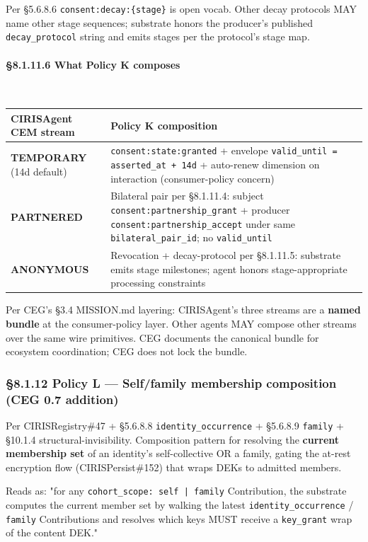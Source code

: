\documentclass[10pt]{article}
\begin{document}
Per §5.6.8.6 \texttt{consent:decay:\{stage\}} is open vocab. Other decay protocols MAY name other stage sequences; substrate honors the producer's published \texttt{decay\_protocol} string and emits stages per the protocol's stage map.


\paragraph{§8.1.11.6 What Policy K composes}\mbox{}\\


{\footnotesize
\begin{longtable}{|p{8.0cm}|p{8.0cm}|}\hline
\textbf{CIRISAgent CEM stream} & \textbf{Policy K composition} \\ \hline\endhead
\textbf{TEMPORARY} (14d default) & \texttt{consent:state:granted} + envelope \texttt{valid\_until = asserted\_at + 14d} + auto-renew dimension on interaction (consumer-policy concern) \\ \hline
\textbf{PARTNERED} & Bilateral pair per §8.1.11.4: subject \texttt{consent:partnership\_grant} + producer \texttt{consent:partnership\_accept} under same \texttt{bilateral\_pair\_id}; no \texttt{valid\_until} \\ \hline
\textbf{ANONYMOUS} & Revocation + decay-protocol per §8.1.11.5: substrate emits stage milestones; agent honors stage-appropriate processing constraints \\ \hline
\end{longtable}}


Per CEG's §3.4 MISSION.md layering: CIRISAgent's three streams are a \textbf{named bundle} at the consumer-policy layer. Other agents MAY compose other streams over the same wire primitives. CEG documents the canonical bundle for ecosystem coordination; CEG does not lock the bundle.


\subsubsection*{§8.1.12 Policy L — Self/family membership composition (CEG 0.7 addition)}


Per CIRISRegistry\#47 + §5.6.8.8 \texttt{identity\_occurrence} + §5.6.8.9 \texttt{family} + §10.1.4 structural-invisibility. Composition pattern for resolving the \textbf{current membership set} of an identity's self-collective OR a family, gating the at-rest encryption flow (CIRISPersist\#152) that wraps DEKs to admitted members.


Reads as: "for any \texttt{cohort\_scope: self | family} Contribution, the substrate computes the current member set by walking the latest \texttt{identity\_occurrence} / \texttt{family} Contributions and resolves which keys MUST receive a \texttt{key\_grant} wrap of the content DEK."
\end{document}
